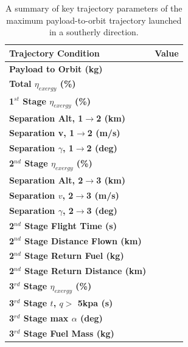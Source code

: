 \begin{table}
	\centering
	\begin{tabular}{l c} 
		\hline \textbf{Trajectory Condition}
		& Value

		\\
		\hline \textbf{Payload to Orbit (kg)}
		& \textbf{\PayloadToOrbitAlternate}
		\\
		\textbf{Total $\eta_{exergy}$ (\%)}
		& \textbf{\totalExergyEffAlternate}
		\\
		\hline 
		\textbf{1$^{st}$ Stage $\eta_{exergy}$ (\%)}
		& \textbf{\firstExergyEffAlternate}
		\\
		\textbf{Separation Alt, 1$\rightarrow$2 (km)}
		& \firstsecondSeparationAltAlternate
		\\
		\textbf{Separation v, 1$\rightarrow$2 (m/s)}
		& \firstsecondSeparationvAlternate
		\\
		\textbf{Separation $\gamma$, 1$\rightarrow$2 (deg)}
		& \firstsecondSeparationgammaAlternate
		\\
		\hline 
		\textbf{2$^{nd}$ Stage $\eta_{exergy}$ (\%)}
		& \textbf{\secondExergyEffAlternate}
		\\
		\textbf{Separation Alt, 2$\rightarrow$3 (km)}
		& \secondthirdSeparationAltAlternate
		\\
		\textbf{Separation $v$, 2$\rightarrow$3 (m/s)}
		& \secondthirdSeparationvAlternate
		\\
		\textbf{Separation $\gamma$, 2$\rightarrow$3 (deg)}
		& \secondthirdSeparationgammaAlternate
		\\
		\textbf{2$^{nd}$ Stage Flight Time (s)}
		& \secondFlightTimeAlternate
		\\
		\textbf{2$^{nd}$ Stage Distance Flown (km)}
		& \SecondDistAlternate
		\\
		\textbf{2$^{nd}$ Stage Return Fuel (kg)}
		& \returnFuelAlternate
		\\
		\textbf{2$^{nd}$ Stage Return Distance (km)}
		& \returnDistAlternate
		\\
		\hline 
		\textbf{3$^{rd}$ Stage $\eta_{exergy}$ (\%)}
		& \textbf{\thirddExergyEffAlternate}
		\\
		\textbf{3$^{rd}$ Stage $t$, $q >$ 5kpa (s)}
		& \thirdqOverFiveAlternate
		\\
		\textbf{3$^{rd}$ Stage max $\alpha$ (deg)}
		& \thirdmaxAoAAlternate
		\\
		\textbf{3$^{rd}$ Stage Fuel Mass (kg)}
		& \thirdmFuelAlternate
		\\
		\hline 
	\end{tabular} 
	\caption{A summary of key trajectory parameters of the maximum payload-to-orbit trajectory launched in a southerly direction.}
	\label{tab:summaryalternate}
\end{table}




